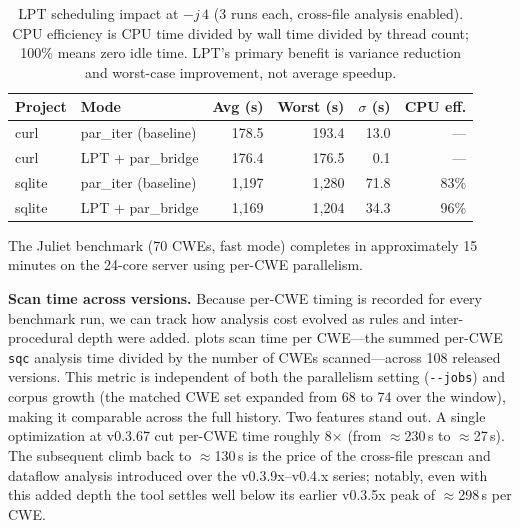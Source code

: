 \begin{table}[t]
\centering
\footnotesize
\begin{tabular}{@{}llrrrr@{}}
\toprule
\textbf{Project} & \textbf{Mode} & \textbf{Avg (s)} & \textbf{Worst (s)} & \textbf{$\sigma$ (s)} & \textbf{CPU eff.} \\
\midrule
curl    & par\_iter (baseline) & 178.5 & 193.4 & 13.0 & --- \\
curl    & LPT + par\_bridge   & 176.4 & 176.5 &  0.1 & --- \\
\addlinespace
sqlite  & par\_iter (baseline) & 1{,}197 & 1{,}280 & 71.8 & 83\% \\
sqlite  & LPT + par\_bridge   & 1{,}169 & 1{,}204 & 34.3 & 96\% \\
\bottomrule
\end{tabular}
\caption{LPT scheduling impact at $-j\,4$ (3 runs each, cross-file
analysis enabled).  CPU efficiency is CPU time divided by wall time
divided by thread count; 100\% means zero idle time.  LPT's primary
benefit is variance reduction and worst-case improvement, not average
speedup.}
\label{tab:parallel}
\end{table}

The Juliet benchmark (70 CWEs, fast mode) completes in approximately
15 minutes on the 24-core server using per-CWE parallelism.

\textbf{Scan time across versions.}  Because per-CWE timing is recorded
for every benchmark run, we can track how analysis cost evolved as rules
and inter-procedural depth were added.   plots scan
time per CWE---the summed per-CWE \texttt{sqc} analysis time divided by
the number of CWEs scanned---across 108 released versions.  This metric
is independent of both the parallelism setting (\texttt{-{}-jobs}) and
corpus growth (the matched CWE set expanded from 68 to 74 over the
window), making it comparable across the full history.  Two features
stand out.  A single optimization at v0.3.67 cut per-CWE time roughly
8$\times$ (from $\approx$230\,s to $\approx$27\,s).  The subsequent climb
back to $\approx$130\,s is the price of the cross-file prescan and
dataflow analysis introduced over the v0.3.9x--v0.4.x series; notably,
even with this added depth the tool settles well below its earlier
v0.3.5x peak of $\approx$298\,s per CWE.


